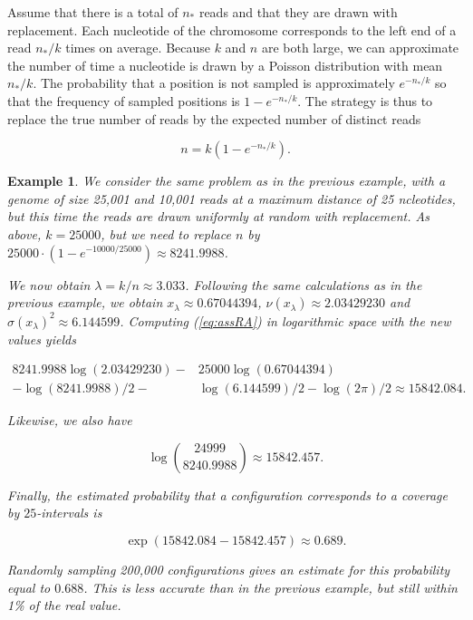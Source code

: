 \documentclass{article}
\newtheorem{example}{Example}
\begin{document}
Assume that there is a total of $n_*$ reads and that they are drawn with
replacement. Each nucleotide of the chromosome corresponds to the left end
of a read $n_*/k$ times on average. Because $k$ and $n$ are both large, we
can approximate the number of time a nucleotide is drawn by a Poisson
distribution with mean $n_*/k$. The probability that a position is not
sampled is approximately $e^{-n_*/k}$ so that the frequency of sampled
positions is $1-e^{-n_*/k}$. The strategy is thus to replace the true
number of reads by the expected number of distinct reads

\begin{equation}
\label{eq:nstar}
n = k(1-e^{-n_*/k}).
\end{equation}


\begin{example}
We consider the same problem as in the previous example, with a genome of
size 25,001 and 10,001 reads at a maximum distance of 25 ncleotides, but
this time the reads are drawn uniformly at random with replacement. As
above, $k=25000$, but we need to replace $n$ by $25000 \cdot
(1-e^{-10000/25000}) \approx 8241.9988$.

We now obtain $\lambda = k/n \approx 3.033$. Following the same
calculations as in the previous example, we obtain $x_\lambda \approx
0.67044394$, $\nu(x_\lambda) \approx 2.03429230$ and
$\sigma(x_\lambda)^2 \approx 6.144599$. Computing (\ref{eq:assRA}) in
logarithmic space with the new values yields

\begin{equation*}
\begin{split}
8241.9988\log(2.03429230) - &25000\log(0.67044394) \\
- \log(8241.9988)/2 - &\log(6.144599)/2 - \log(2\pi)/2
\approx 15842.084.
\end{split}
\end{equation*}

Likewise, we also have

\begin{equation*}
\log { 24999 \choose 8240.9988 } \approx 15842.457.
\end{equation*}

Finally, the estimated probability that a configuration corresponds to a
coverage by $25$-intervals is

\begin{equation*}
\exp(15842.084-15842.457) \approx 0.689.
\end{equation*}

Randomly sampling 200,000 configurations gives an estimate for this
probability equal to $0.688$. This is less accurate than in the previous
example, but still within 1\% of the real value.
\end{example}
\end{document}
